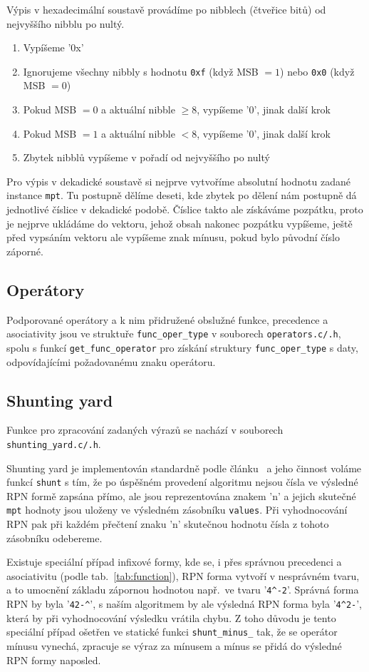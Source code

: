 Výpis v hexadecimální soustavě provádíme po nibblech (čtveřice bitů) od nejvyššího nibblu po nultý.
\begin{enumerate}
    \item Vypíšeme '0x'
    \item Ignorujeme všechny nibbly s hodnotu \verb|0xf| (když MSB $ = 1$) nebo \verb|0x0| (když MSB $ = 0$)
    \item Pokud MSB $ = 0$ a aktuální nibble $\geq 8$, vypíšeme '0', jinak další krok
    \item Pokud MSB $ = 1$ a aktuální nibble $<8$, vypíšeme '0', jinak další krok
    \item Zbytek nibblů vypíšeme v pořadí od nejvyššího po nultý
\end{enumerate}

Pro výpis v dekadické soustavě si nejprve vytvoříme absolutní hodnotu zadané instance \verb|mpt|. Tu postupně dělíme deseti, kde zbytek po dělení nám postupně dá jednotlivé číslice v dekadické podobě. Číslice takto ale získáváme pozpátku, proto je nejprve ukládáme do vektoru, jehož obsah nakonec pozpátku vypíšeme, ještě před vypsáním vektoru ale vypíšeme znak mínusu, pokud bylo původní číslo záporné.

\subsection{Operátory}
Podporované operátory a k nim přidružené obslužné funkce, precedence a asociativity jsou ve struktuře \verb|func_oper_type| v souborech \verb|operators.c/.h|, spolu s funkcí \verb|get_func_operator| pro získání struktury \verb|func_oper_type| s daty, odpovídajícími požadovanému znaku operátoru.

\subsection{Shunting yard}
Funkce pro zpracování zadaných výrazů se nachází v souborech \verb|shunting_yard.c/.h|.

Shunting yard je implementován standardně podle článku~\cite{bib:shunting_yard} a jeho činnost voláme funkcí \verb|shunt| s tím, že po úspěšném provedení algoritmu nejsou čísla ve výsledné RPN formě zapsána přímo, ale jsou reprezentována znakem 'n' a jejich skutečné \verb|mpt| hodnoty jsou uloženy ve výsledném zásobníku \verb|values|. Při vyhodnocování RPN pak při každém přečtení znaku 'n' skutečnou hodnotu čísla z tohoto zásobníku odebereme. 

Existuje speciální případ infixové formy, kde se, i přes správnou precedenci a asociativitu (podle tab.~\ref{tab:function}), RPN forma vytvoří v nesprávném tvaru, a to umocnění základu zápornou hodnotou např.~ve tvaru '\verb|4^-2|'. Správná forma RPN by byla '\verb|42-^|', s naším algoritmem by ale výsledná RPN forma byla '\verb|4^2-|', která by při vyhodnocování výsledku vrátila chybu. Z toho důvodu je tento speciální případ ošetřen ve statické funkci \verb|shunt_minus_| tak, že se operátor mínusu vynechá, zpracuje se výraz za mínusem a mínus se přidá do výsledné RPN formy naposled.

